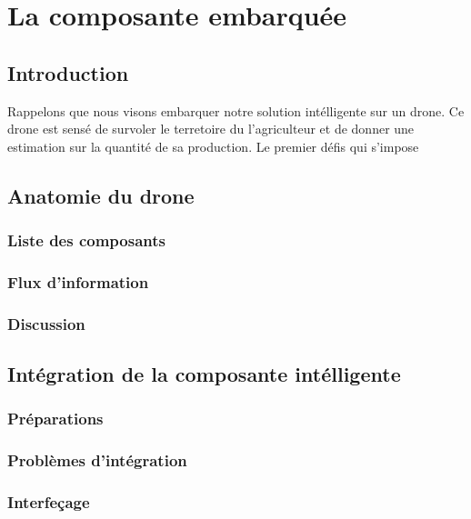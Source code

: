 \chapter{La composante embarquée}
\section*{Introduction}
Rappelons que nous visons embarquer notre solution intélligente sur un drone. Ce drone est sensé de survoler le terretoire du l'agriculteur et de donner une estimation sur la quantité de sa production. 
Le premier défis qui s'impose 
\section{Anatomie du drone}
\subsection{Liste des composants}
\subsection{Flux d'information}
\subsection{Discussion}
\section{Intégration de la composante intélligente}
\subsection{Préparations}
\subsection{Problèmes d'intégration}
\subsection{Interfeçage}



